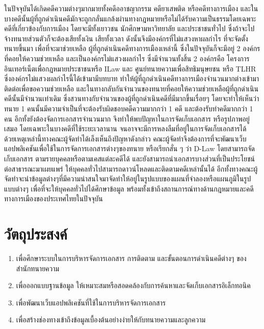 \documentclass[12pt,oneside,openright,a4paper]{cpe-thai-project}
\begin{document}
\hspace*{1cm} ในปัจจุบันได้เกิดคดีความต่างๆมากมายทั้งคดีออาชญากรรม คดียาเสพติด หรือคดีทางการเมือง และในบางคดีนั้นผู้ที่ถูกดำเนินคดีมักจะถูกกลั่นแกล้งผ่านทางกฎหมายหรือไม่ได้รับความเป็นธรรมโดยเฉพาะคดีที่เกี่ยวข้องกับการเมือง โดยจะมีทั้งเยาวชน นักศึกษามหาวิทยาลัย และประชาชนทั่วไป ซึ่งถ้าจะไปจ้างทนายส่วนตัวก็จะต้องเสียทั้งเงิน เสียทั้งเวลา ดังนั้นจึงมีองค์กรที่ไม่แสวงหาผลกำไร ที่จะจัดตั้งทนายขึ้นมา เพื่อที่จะมาช่วยเหลือ ผู้ที่ถูกดำเนินคดีทางการเมืองเหล่านี้ ซึ่งในปัจจุบันก็จะมีอยู่ 2 องค์กรที่คอยให้ความช่วยเหลือ และเป็นองค์กรไม่แสวงผลกำไร ซึ่งมีจำนวนทั้งสิ้น 2 องค์กรคือ โครงการอินเทอร์เน็ตเพื่อกฎหมายประชาชนหรือ ILaw และ ศูนย์ทนายความเพื่อสิทธิมนุษยชน หรือ TLHR ซึ่งองค์กรไม่แสวงผลกำไรนี้ได้เข้ามามีบทบาท ทำให้ผู้ที่ถูกดำเนินคดีทางการเมืองจำนวนมากต่างเข้ามาติดต่อเพื่อขอความช่วยเหลือ และในทางกลับกันจำนวนของทนายที่คอยให้ความช่วยเหลือผู้ที่ถูกดำเนินคดีนั้นมีจำนวนเท่าเดิม ซึ่งสวนทางกับจำนวนของผู้ที่ถูกดำเนินคดีที่มีมากขึ้นเรื่อยๆ โดยจะทำให้เห็นว่าทนาย 1 คนนั้นมีความจำเป็นที่จะต้องรับผิดชอบคดีความมากกว่า 1 คดี และต้องรับทำคดีมากกว่า 1 คน อีกทั้งยังต้องจัดการเอกสารจำนวนมาก จึงทำให้พบปัญหาในการจัดเก็บเอกสาร หรือรูปภาพอยู่เสมอ โดยเฉพาะในบางคดีที่ใช้ระยะเวลานาน จนอาจจะมีการหลงลืมที่อยู่ในการจัดเก็บเอกสารได้ \\
\hspace*{1cm} ด้วยเหตุเหล่านี้ทางคณะผู้จัดทำได้เล็งเห็นถึงปัญหาดังกล่าว คณะผู้จัดทำจึงต้องการที่จะพัฒนาเว็บแอปพลิเคชันเพื่อใช้ในการจัดการเอกสารต่างๆของทนาย หรือเรียกสั่น ๆ ว่า D-Law โดยสามารถจัดเก็บเอกสาร ตามรายบุคคลหรือตามเคสแต่ละคดีได้ และยังสามารถนำเอกสารบางส่วนที่เป็นประโยชน์ต่อสาธารณะมาเผยแพร่ ให้บุคคลทั่วไปสามารถดาวน์โหลดและติดตามคดีเหล่านั้นได้ อีกทั้งทางคณะผู้จัดทำจะนำข้อมูลต่างๆที่มีความน่าสนใจมาจัดทำให้อยู่ในรูปแบบของแผนที่จำลองหรือแผนภูมิในรูปแบบต่างๆ เพื่อที่จะให้บุคคลทั่วไปได้ศึกษาข้อมูล พร้อมทั้งเข้าถึงสถานการณ์ทางด้านกฎหมายและคดีทางการเมืองของประเทศไทยในปัจจุบัน

\section{วัตถุประสงค์}
\begin{enumerate}
  \item เพื่อศึกษาระบบในการบริหารจัดการเอกสาร การติดตาม และขั้นตอนการดำเนินคดีต่างๆ ของสำนักทนายความ
  \item เพื่อออกแบบฐานข้อมูล ให้เหมาะสมหรือสอดคล้องกับการค้นหาและจัดเก็บเอกสารอิเล็กทอนิค
  \item เพื่อพัฒนาเว็บแอปพลิเคชันที่ใช้ในการบริหารจัดการเอกสาร
  \item เพื่อสร้างช่องทางเข้าถึงข้อมูลเบื้องต้นอย่างง่ายให้กับทนายความและลูกความ
\end{enumerate}
\end{document}
